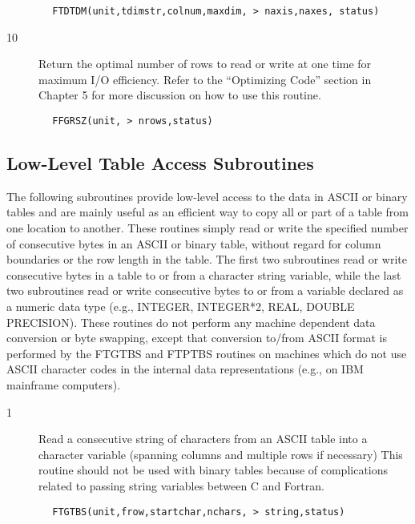 \documentclass[11pt]{book}
\begin{document}
\begin{verbatim}
        FTDTDM(unit,tdimstr,colnum,maxdim, > naxis,naxes, status)
\end{verbatim}

\begin{description}
\item[10]  Return the optimal number of rows to read or write at one time for
    maximum I/O efficiency.  Refer to the ``Optimizing Code'' section
   in Chapter 5 for more discussion on how to use this routine.
\end{description}


\begin{verbatim}
        FFGRSZ(unit, > nrows,status)
\end{verbatim}


\subsection{Low-Level Table Access Subroutines \label{FTGTBS}}

The following subroutines provide low-level access to the data in ASCII
or binary tables and are mainly useful as an efficient way to copy all
or part of a table from one location to another.  These routines simply
read or write the specified number of consecutive bytes in an ASCII or
binary table, without regard for column boundaries or the row length in
the table.  The first two subroutines read or write consecutive bytes
in a table to or from a character string variable, while the last two
subroutines read or write consecutive bytes to or from a variable
declared as a numeric data type (e.g., INTEGER, INTEGER*2, REAL, DOUBLE
PRECISION).  These routines do not perform any machine dependent data
conversion or byte swapping, except that conversion to/from ASCII
format is performed by the FTGTBS and FTPTBS routines on machines which
do not use ASCII character codes in the internal data representations
(e.g., on IBM mainframe computers).


\begin{description}
\item[1 ] Read a consecutive string of characters from an ASCII table
    into a character variable (spanning columns and multiple rows if necessary)
    This routine should not be used with binary tables because of
   complications related to passing string variables between C and Fortran.
\end{description}

\begin{verbatim}
        FTGTBS(unit,frow,startchar,nchars, > string,status)
\end{verbatim}
\end{document}
